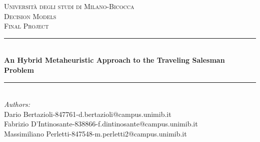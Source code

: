 \documentclass[10pt]{article}
\begin{document}
\begin{titlepage}

\newcommand{\HRule}{\rule{\linewidth}{0.5mm}} %

\center %
 

\textsc{\LARGE Università degli studi di Milano-Bicocca}\\[1cm] %
\textsc{\Large Decision Models}\\[0.3cm] %
\textsc{\large Final Project}\\[0.1cm] %

\HRule \\[0.4cm]
{ \huge \bfseries An Hybrid Metaheuristic Approach to the Traveling Salesman Problem }\\[0.4cm] %
\HRule \\[1.5cm]
 

\large
\emph{Authors:}\\
Dario Bertazioli-847761-d.bertazioli@campus.unimib.it \\   %
Fabrizio D'Intinosante-838866-f.dintinosante@campus.unimib.it \\
Massimiliano Perletti-847548-m.perletti2@campus.unimib.it\\[1cm] %



\end{titlepage}
\end{document}
